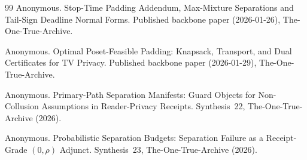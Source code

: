 \documentclass[11pt]{article}
\begin{document}
\begin{thebibliography}{99}
Anonymous.
\newblock Stop-Time Padding Addendum, Max-Mixture Separations and Tail-Sign Deadline Normal Forms.
\newblock Published backbone paper (2026-01-26), The-One-True-Archive.

Anonymous.
\newblock Optimal Poset-Feasible Padding: Knapsack, Transport, and Dual Certificates for TV Privacy.
\newblock Published backbone paper (2026-01-29), The-One-True-Archive.



Anonymous.
\newblock Primary-Path Separation Manifests: Guard Objects for Non-Collusion Assumptions in Reader-Privacy Receipts.
\newblock Synthesis~22, The-One-True-Archive (2026).

Anonymous.
\newblock Probabilistic Separation Budgets: Separation Failure as a Receipt-Grade $(0,\rho)$ Adjunct.
\newblock Synthesis~23, The-One-True-Archive (2026).

\end{thebibliography}
\end{document}
